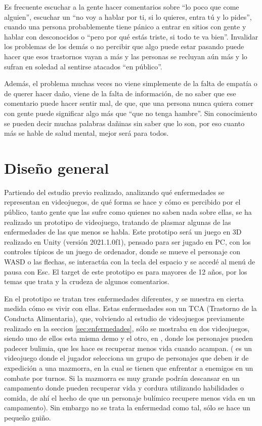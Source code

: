 \documentclass[12pt, a4paper,twoside,titlepage]{book}
\begin{document}
Es frecuente escuchar a la gente hacer comentarios sobre ``lo poco que come alguien'', escuchar un ``no voy a hablar por ti, si lo quieres, entra tú y lo pides'', cuando una persona probablemente tiene pánico a entrar en sitios con gente y hablar con desconocidos o ``pero por qué estás triste, si todo te va bien''. Invalidar los problemas de los demás o no percibir que algo puede estar pasando puede hacer que esos trastornos vayan a más y las personas se recluyan aún más y lo sufran en soledad al sentirse atacados ``en público''. 

Además, el problema muchas veces no viene simplemente de la falta de empatía o de querer hacer daño, viene de la falta de información, de no saber que ese comentario puede hacer sentir mal, de que, que una persona nunca quiera comer con gente puede significar algo más que ``que no tenga hambre''. Sin conocimiento se pueden decir muchas palabras dañinas sin saber que lo son, por eso cuanto más se hable de salud mental, mejor será para todos. 

\label{sec:diseño}
\section{Diseño general}
Partiendo del estudio previo realizado, analizando qué enfermedades se representan en videojuegos, de qué forma se hace y cómo es percibido por el público, tanto gente que las sufre como quienes no saben nada sobre ellas, se ha realizado un prototipo de videojuego, tratando de plasmar algunas de las enfermedades de las que menos se habla. Este prototipo será un juego en 3D realizado en Unity (versión 2021.1.0f1), pensado para ser jugado en PC, con los controles típicos de un juego de ordenador, donde se mueve el personaje con WASD o las flechas, se interactúa con la tecla del espacio y se accedé al menú de pausa con Esc. El target de este prototipo es para mayores de 12 años, por los temas que trata y la crudeza de algunos comentarios.  

En el prototipo se tratan tres enfermedades diferentes, y se muestra en cierta medida cómo es vivir con ellas. Estas enfermedades son un TCA (Trastorno de la Conducta Alimentaria), que, volviendo al estudio de videojuegos previamente realizado en la seccion \ref{sec:enfermedades}, sólo se mostraba en dos videojuegos, siendo uno de ellos esta misma demo y el otro, en , donde los personajes pueden padecer bulimia, que les hace es recuperar menos vida cuando acampan. ( es un videojuego donde el jugador selecciona un grupo de personajes que deben ir de expedición a una mazmorra, en la cual se tienen que enfrentar a enemigos en un combate por turnos. Si la mazmorra es muy grande podrán descansar en un campamento donde pueden recuperar vida y cordura utilizando habilidades o comida, de ahí el hecho de que un personaje bulímico recupere menos vida en un campamento). Sin embargo no se trata la enfermedad como tal, sólo se hace un pequeño guiño. 
\end{document}
